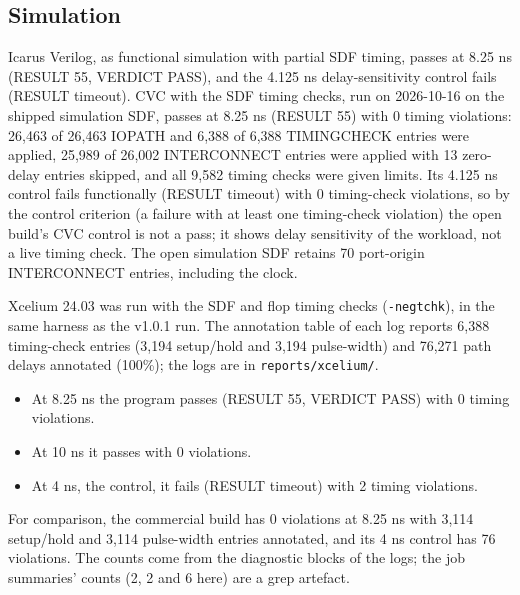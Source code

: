 \documentclass[11pt,letterpaper]{article}
\newcommand{\sk}[1]{\texttt{#1}}
\renewcommand{\_}{\textunderscore\penalty0\hskip0pt\relax}
\begin{document}
\subsection*{Simulation}
Icarus Verilog, as functional simulation with partial SDF timing, passes at 8.25 ns (RESULT 55, VERDICT PASS), and the 4.125 ns delay-sensitivity control fails (RESULT timeout). CVC with the SDF timing checks, run on 2026-10-16 on the shipped simulation SDF, passes at 8.25 ns (RESULT 55) with 0 timing violations: 26,463 of 26,463 IOPATH and 6,388 of 6,388 TIMINGCHECK entries were applied, 25,989 of 26,002 INTERCONNECT entries were applied with 13 zero-delay entries skipped, and all 9,582 timing checks were given limits. Its 4.125 ns control fails functionally (RESULT timeout) with 0 timing-check violations, so by the control criterion (a failure with at least one timing-check violation) the open build's CVC control is not a pass; it shows delay sensitivity of the workload, not a live timing check. The open simulation SDF retains 70 port-origin INTERCONNECT entries, including the clock.

Xcelium 24.03 was run with the SDF and flop timing checks (\sk{-neg\_tchk}), in the same harness as the v1.0.1 run. The annotation table of each log reports 6,388 timing-check entries (3,194 setup/hold and 3,194 pulse-width) and 76,271 path delays annotated (100\%); the logs are in \sk{reports/xcelium/}.
\begin{itemize}
\item At 8.25 ns the program passes (RESULT 55, VERDICT PASS) with 0 timing violations.
\item At 10 ns it passes with 0 violations.
\item At 4 ns, the control, it fails (RESULT timeout) with 2 timing violations.
\end{itemize}
For comparison, the commercial build has 0 violations at 8.25 ns with 3,114 setup/hold and 3,114 pulse-width entries annotated, and its 4 ns control has 76 violations. The counts come from the diagnostic blocks of the logs; the job summaries' counts (2, 2 and 6 here) are a grep artefact.
\end{document}

